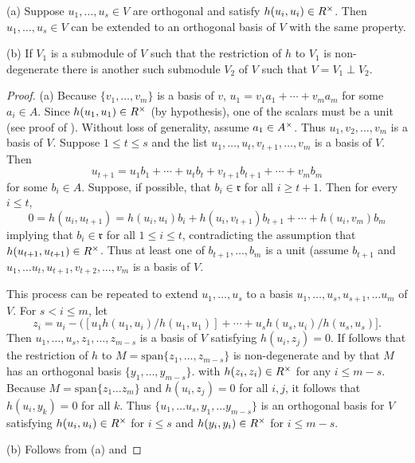 \begin{lemma}\label{lemma2.3}
\begin{description}
\item{(a)} Suppose $u_1, \dotsc, u_s \in V$ are orthogonal and satisfy $h(u_i, u_i) \in R^\times$.
Then $u_1, \dotsc , u_s \in V$ can be extended to an orthogonal basis of $V$ with the same property.
\item{(b)} If $V_1$ is a submodule of $V$ such that the restriction of $h$ to $V_1$ is non-degenerate there is another such submodule $V_2$ of $V$ such that $V = V_1 \perp V_2$.
\end{description}
\end{lemma}
\begin{proof}
(a) Because $\{v_1, \dotsc, v_m \}$ is a basis of $v$, $u_1 = v_1 a_1 + \dotsb + v_m a_m$ for some $a_i \in A$.
Since $h(u_1, u_1) \in R^\times$ (by hypothesis), one of the scalars must be a unit (see proof of ).
Without loss of generality, assume $a_1 \in A^\times$.
Thus $u_1, v_2, \dotsc, v_m$ is a basis of $V$.
Suppose $1 \le t \le s$ and the list $u_1, \dotsc, u_t, v_{t+1}, \dotsc, v_m$ is a basis of $V$.
Then 
\[
u_{t+1} = u_1b_1 + \dotsb + u_t b_t + v_{t+1} b_{t+1} + \dotsb + v_m b_m
\]
for some $b_i \in A$.
Suppose, if possible, that $b_i \in \mathfrak{r}$ for all $i \ge t+1$.
Then for every $i \le t$,
\[
0 = h(u_i, u_{t+1}) = h(u_i, u_i) b_i + h(u_i, v_{t+1})b_{t+1} + \dotsb + h(u_i, v_m) b_m
\]
implying that $b_i \in \mathfrak{r}$ for all $1 \le i \le t$, contradicting the assumption that $h(u_{t+1}, u_{t+1}) \in R^\times$.
Thus at least one of $b_{t+1}, \dotsc,b_m$ is a unit (assume $b_{t+1}$ and $u_1, \dotsc u_t, u_{t+1}, v_{t+2}, \dotsc, v_m$ is a basis of $V$.

This process can be repeated to extend $u_1, \dotsc, u_s$ to a basis $u_1, \dotsc, u_s, u_{s+1}, \dotsc u_m$ of $V$.
For $s < i \le m$, let
\[
z_i = u_i - ([u_1h(u_1, u_i)/h(u_1, u_1)] + \dotsb + u_s h(u_s, u_i) / h(u_s, u_s)].
\]
Then $u_1, \dotsc, u_s, z_1, \dotsc, z_{m-s}$ is a basis of $V$ satisfying $h(u_i, z_j) = 0$.
If follows that the restriction of $h$ to $M = \text{span} \{z_1, \dotsc, z_{m-s}\}$ 
is non-degenerate and by  that $M$ has an orthogonal basis $\{y_1, \dotsc, y_{m-s}\}$.
with $h(z_i, z_i) \in R^\times$ for any $i \le m - s$.
Because $M = \text{span} \{z_1 \dotsc z_m\}$ and $h(u_i, z_j) = 0$ for all $i, j$, it follows that $h(u_i, y_k) = 0$ for all $k$.
Thus $\{u_1, \dotsc u_s, y_1, \dotsc y_{m - s} \}$ is an orthogonal basis for $V$ satisfying $h(u_i, u_i) \in R^\times$ for $i \le s$ and
$h(y_i, y_i) \in R^\times$ for $i \le m -s$.

(b) Follows from (a) and 
\end{proof}

